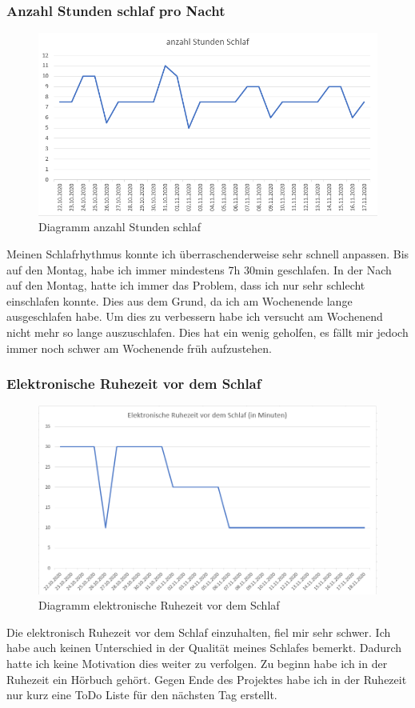 \subsubsection{Anzahl Stunden schlaf pro Nacht}
\begin{figure}[H]
  \centering
  \includegraphics[width=0.7\linewidth]{./images/dario_schlaf.PNG}
  \caption{Diagramm anzahl Stunden schlaf}
\end{figure}
Meinen Schlafrhythmus konnte ich überraschenderweise sehr schnell anpassen. Bis auf den Montag, habe ich immer mindestens 7h 30min geschlafen. In der Nach auf den Montag, hatte ich immer das Problem, dass ich nur sehr schlecht einschlafen konnte. Dies aus dem Grund, da ich am Wochenende lange ausgeschlafen habe. Um dies zu verbessern habe ich versucht am Wochenend nicht mehr so lange auszuschlafen. Dies hat ein wenig geholfen, es fällt mir jedoch immer noch schwer am Wochenende früh aufzustehen.
\subsubsection{Elektronische Ruhezeit vor dem Schlaf}
\begin{figure}[H]
  \centering
  \includegraphics[width=0.7\linewidth]{./images/dario_ruhezeit.PNG}
  \caption{Diagramm elektronische Ruhezeit vor dem Schlaf}
\end{figure}
Die elektronisch Ruhezeit vor dem Schlaf einzuhalten, fiel mir sehr schwer.
\newline
Ich habe auch keinen Unterschied in der Qualität meines Schlafes bemerkt. Dadurch hatte ich keine Motivation dies weiter zu verfolgen.
\newline
Zu beginn habe ich in der Ruhezeit ein Hörbuch gehört. Gegen Ende des Projektes habe ich in der Ruhezeit nur kurz eine ToDo Liste für den nächsten Tag erstellt.
